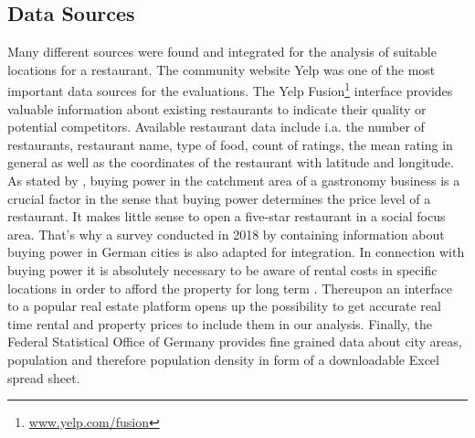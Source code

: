 \subsection{Data Sources}
\label{subsec:sources}
Many different sources were found and integrated for the analysis of suitable locations for a restaurant. The community website Yelp was one of the most important data sources for the evaluations. The Yelp Fusion\footnote{\href{https://www.yelp.com/fusion}{www.yelp.com/fusion}} interface provides valuable information about existing restaurants to indicate their quality or potential competitors. Available restaurant data include i.a. the number of restaurants, restaurant name, type of food, count of ratings, the mean rating in general as well as the coordinates of the restaurant with latitude and longitude.%
\newline
As stated by \cite{locana}, buying power in the catchment area of a gastronomy business is a crucial factor in the sense that buying power determines the price level of a restaurant. It makes little sense to open a five-star restaurant in a social focus area. That's why a survey conducted in 2018 by \cite{buyingpower} containing information about buying power in German cities is also adapted for integration.
\newline
In connection with buying power it is absolutely necessary to be aware of rental costs in specific locations in order to afford the property for long term \cite{locana}. Thereupon an interface to a popular real estate platform \cite{ImmoScout} opens up the possibility to get accurate real time rental and property prices to include them in our analysis.
\newline
Finally, the Federal Statistical Office of Germany provides fine grained data about city areas, population and therefore population density in form of a downloadable Excel spread sheet.\cite{destatis}


